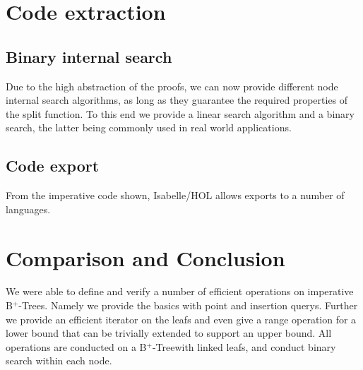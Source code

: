 \documentclass[a4paper,UKenglish,cleveref, autoref, thm-restate]{lipics-v2021}
\newcommand{\btree}{B$^+$-Tree}
\newcommand{\btrees}{B$^+$-Trees}
\begin{document}
\section{Code extraction}

\subsection{Binary internal search}
\label{sec:imperative_split}

Due to the high abstraction of the proofs,
we can now provide different node internal search algorithms,
as long as they guarantee the required properties of the split function.
To this end we provide a linear search algorithm
and a binary search, the latter being commonly used in real world applications.

\subsection{Code export}
\label{sec:code_export}

From the imperative code shown,
Isabelle/HOL allows exports to a number of languages.


\section{Comparison and Conclusion}
\label{sec:conclusion}

We were able to define and verify a number of efficient operations
on imperative \btrees.
Namely we provide the basics with point and insertion querys.
Further we provide an efficient iterator on the leafs
and even give a range operation for a lower bound that
can be trivially extended to support an upper bound.
All operations are conducted on a \btree with linked leafs,
and conduct binary search within each node.
\end{document}
